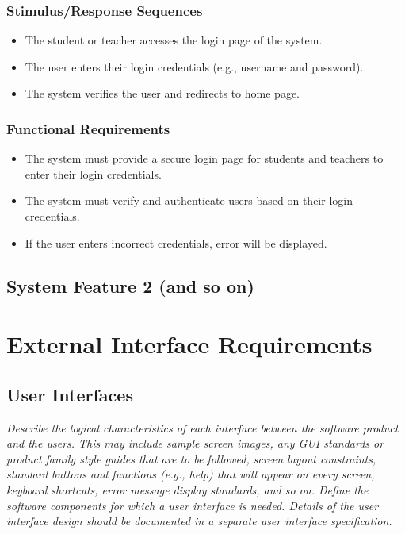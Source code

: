 \documentclass{article}
\begin{document}
\subsubsection{Stimulus/Response Sequences}
\begin{itemize}
  \item The student or teacher accesses the login page of the system.
  \item The user enters their login credentials (e.g., username and password).
  \item The system verifies the user and redirects to home page.
\end{itemize}

\subsubsection{Functional Requirements}
\begin{itemize}
\item The system must provide a secure login page for students and teachers to enter their login credentials.
\item The system must verify and authenticate users based on their login credentials.
\item If the user enters incorrect credentials, error will be displayed.
\end{itemize}




\subsection{System Feature 2 (and so on)}
\section{External Interface Requirements}
\subsection{User Interfaces}
\emph{Describe the logical characteristics of each interface between the software product and the users. This may include sample screen images, any GUI standards or product family style guides that are to be followed, screen layout constraints, standard buttons and functions (e.g., help) that will appear on every screen, keyboard shortcuts, error message display standards, and so on. Define the software components for which a user interface is needed. Details of the user interface design should be documented in a separate user interface specification.}
\end{document}
